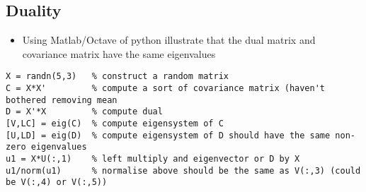 \documentclass[11pt]{article}
\begin{document}
\subsection{Duality}
\label{sec:org3ffdcbe}
\begin{itemize}
\item Using Matlab/Octave of python illustrate that the dual matrix and
covariance matrix have the same eigenvalues
\end{itemize}
\begin{verbatim}
X = randn(5,3)   % construct a random matrix
C = X*X'         % compute a sort of covariance matrix (haven't bothered removing mean
D = X'*X         % compute dual
[V,LC] = eig(C)  % compute eigensystem of C
[U,LD] = eig(D)  % compute eigensystem of D should have the same non-zero eigenvalues
u1 = X*U(:,1)    % left multiply and eigenvector or D by X
u1/norm(u1)      % normalise above should be the same as V(:,3) (could be V(:,4) or V(:,5))
\end{verbatim}
\end{document}
